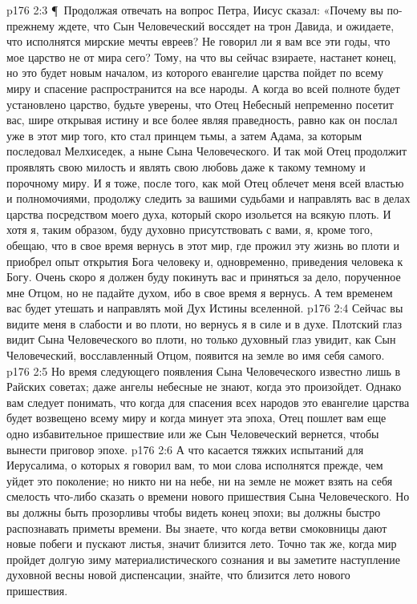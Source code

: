 \vs p176 2:3 \P\ Продолжая отвечать на вопрос Петра, Иисус сказал: «Почему вы по\hyp{}прежнему ждете, что Сын Человеческий воссядет на трон Давида, и ожидаете, что исполнятся мирские мечты евреев? Не говорил ли я вам все эти годы, что мое царство не от мира сего? Тому, на что вы сейчас взираете, настанет конец, но это будет новым началом, из которого евангелие царства пойдет по всему миру и спасение распространится на все народы. А когда во всей полноте будет установлено царство, будьте уверены, что Отец Небесный непременно посетит вас, шире открывая истину и все более являя праведность, равно как он послал уже в этот мир того, кто стал принцем тьмы, а затем Адама, за которым последовал Мелхиседек, а ныне Сына Человеческого. И так мой Отец продолжит проявлять свою милость и являть свою любовь даже к такому темному и порочному миру. И я тоже, после того, как мой Отец облечет меня всей властью и полномочиями, продолжу следить за вашими судьбами и направлять вас в делах царства посредством моего духа, который скоро изольется на всякую плоть. И хотя я, таким образом, буду духовно присутствовать с вами, я, кроме того, обещаю, что в свое время вернусь в этот мир, где прожил эту жизнь во плоти и приобрел опыт открытия Бога человеку и, одновременно, приведения человека к Богу. Очень скоро я должен буду покинуть вас и приняться за дело, порученное мне Отцом, но не падайте духом, ибо в свое время я вернусь. А тем временем вас будет утешать и направлять мой Дух Истины вселенной.
\vs p176 2:4 Сейчас вы видите меня в слабости и во плоти, но вернусь я в силе и в духе. Плотский глаз видит Сына Человеческого во плоти, но только духовный глаз увидит, как Сын Человеческий, восславленный Отцом, появится на земле во имя себя самого.
\vs p176 2:5 Но время следующего появления Сына Человеческого известно лишь в Райских советах; даже ангелы небесные не знают, когда это произойдет. Однако вам следует понимать, что когда для спасения всех народов это евангелие царства будет возвещено всему миру и когда минует эта эпоха, Отец пошлет вам еще одно избавительное пришествие или же Сын Человеческий вернется, чтобы вынести приговор эпохе.
\vs p176 2:6 А что касается тяжких испытаний для Иерусалима, о которых я говорил вам, то мои слова исполнятся прежде, чем уйдет это поколение; но никто ни на небе, ни на земле не может взять на себя смелость что\hyp{}либо сказать о времени нового пришествия Сына Человеческого. Но вы должны быть прозорливы чтобы видеть конец эпохи; вы должны быстро распознавать приметы времени. Вы знаете, что когда ветви смоковницы дают новые побеги и пускают листья, значит близится лето. Точно так же, когда мир пройдет долгую зиму материалистического сознания и вы заметите наступление духовной весны новой диспенсации, знайте, что близится лето нового пришествия.
